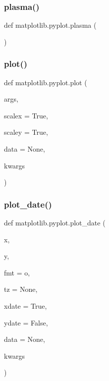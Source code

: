 \mbox{\label{namespacematplotlib_1_1pyplot_a3c622ed968cedf7cfe24747b64247a10}} 
\subsubsection{\texorpdfstring{plasma()}{plasma()}}
{\footnotesize\ttfamily def matplotlib.\+pyplot.\+plasma (\begin{DoxyParamCaption}{ }\end{DoxyParamCaption})}

\mbox{\label{namespacematplotlib_1_1pyplot_a3e6e3cc751f5781e86ee3058e44b3d1c}} 
\subsubsection{\texorpdfstring{plot()}{plot()}}
{\footnotesize\ttfamily def matplotlib.\+pyplot.\+plot (\begin{DoxyParamCaption}\item[{}]{args,  }\item[{}]{scalex = {\ttfamily True},  }\item[{}]{scaley = {\ttfamily True},  }\item[{}]{data = {\ttfamily None},  }\item[{}]{kwargs }\end{DoxyParamCaption})}

\mbox{\label{namespacematplotlib_1_1pyplot_a2557ff424a99fdae5bc63c1b4fc847b6}} 
\subsubsection{\texorpdfstring{plot\+\_\+date()}{plot\_date()}}
{\footnotesize\ttfamily def matplotlib.\+pyplot.\+plot\+\_\+date (\begin{DoxyParamCaption}\item[{}]{x,  }\item[{}]{y,  }\item[{}]{fmt = {\ttfamily \textquotesingle{}o\textquotesingle{}},  }\item[{}]{tz = {\ttfamily None},  }\item[{}]{xdate = {\ttfamily True},  }\item[{}]{ydate = {\ttfamily False},  }\item[{}]{data = {\ttfamily None},  }\item[{}]{kwargs }\end{DoxyParamCaption})}

